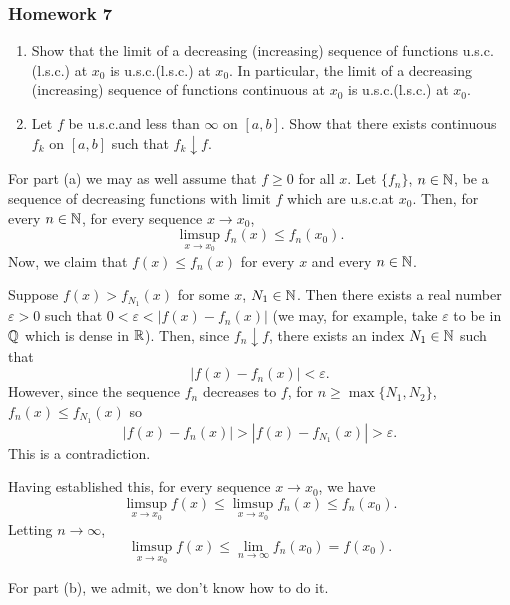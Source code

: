 \subsubsection{Homework 7}
\setcounter{exercise}{0}
\setcounter{equation}{0}

\begin{problem}
  \hfill
  \begin{enumerate}[label=(\alph*),noitemsep]
  \item Show that the limit of a decreasing (increasing) sequence of
    functions u.s.c.\@ (l.s.c.) at $x_0$ is u.s.c.\@ (l.s.c.) at $x_0$. In
    particular, the limit of a decreasing (increasing) sequence of
    functions continuous at $x_0$ is u.s.c.\@ (l.s.c.) at $x_0$.
  \item Let $f$ be u.s.c.\@ and less than $\infty$ on $[a,b]$. Show that there
    exists continuous $f_k$ on $[a,b]$ such that $f_k\downarrow f$.
  \end{enumerate}
\end{problem}
\begin{solution}
  For part (a) we may as well assume that $f\geq 0$ for all $x$. Let
  $\{f_n\}$, $n\in\mathbb{N}$, be a sequence of decreasing functions with limit
  $f$ which are u.s.c.\@ at $x_0$. Then, for every $n\in\mathbb{N}$, for every
  sequence $x\to x_0$,
  \[
    \limsup_{x\to x_0}f_n(x)\leq f_n(x_0).
  \]
  Now, we claim that $f(x)\leq f_n(x)$ for every $x$ and every $n\in\mathbb{N}$.
  \begin{subproof}
    Suppose $f(x)>f_{N_1}(x)$ for some $x$, $N_1\in\mathbb{N}$. Then there exists
    a real number $\varepsilon>0$ such that $0<\varepsilon<|f(x)-f_n(x)|$
    (we may, for example, take $\varepsilon$ to be in $\mathbb{Q}$ which is dense
    in $\mathbb{R}$). Then, since $f_n\downarrow f$, there exists an index
    $N_1\in\mathbb{N}$ such that
    \[
      |f(x)-f_n(x)|<\varepsilon.
    \]
    However, since the sequence $f_n$ decreases to $f$, for
    $n\geq\max\{N_1,N_2\}$, $f_n(x)\leq f_{N_1}(x)$ so
    \[
      |f(x)-f_n(x)|>|f(x)-f_{N_1}(x)|>\varepsilon.
    \]
    This is a contradiction.
  \end{subproof}
  Having established this, for every sequence $x\to x_0$, we have
  \[
    \limsup_{x\to x_0} f(x)\leq \limsup_{x\to x_0} f_n(x)\leq f_n(x_0).
  \]
  Letting $n\to\infty$,
  \[
    \limsup_{x\to x_0} f(x)\leq \lim_{n\to\infty}f_n(x_0)=f(x_0).
  \]

  For part (b), we admit, we don't know how to do it.
\end{solution}

